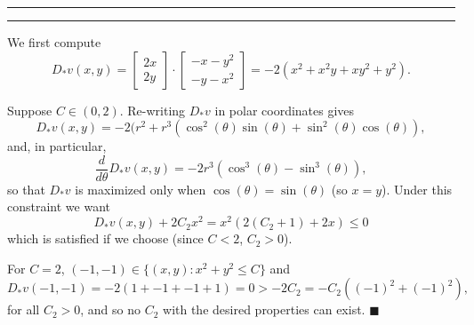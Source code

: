 \documentclass[11pt]{article}
\newcounter{questionCounter}
\newcounter{partCounter}[questionCounter]
\newenvironment{question}[2][\arabic{questionCounter}]{%
    \setcounter{partCounter}{0}%
    \vspace{.25in} \hrule \vspace{0.5em}%
        \noindent{\bf #2}%
    \vspace{0.8em} \hrule \vspace{.10in}%
    \addtocounter{questionCounter}{1}%
}{}
\renewcommand{\qed}{\quad $\blacksquare$}
\begin{document}
\begin{question}{Problem 3}
We first compute
\[D_*v(x,y)
    =   \begin{bmatrix}
            2x  \\
            2y
    \end{bmatrix}
  \cdot \begin{bmatrix}
            -x - y^2    \\
            -y - x^2
        \end{bmatrix}
    =   -2(x^2 + x^2y + xy^2 + y^2).
\]

Suppose $C \in (0,2)$. Re-writing $D_*v$ in polar coordinates gives
\[D_*v(x,y)
    =   -2(r^2 + r^3(\cos^2(\theta)\sin(\theta) + \sin^2(\theta)\cos(\theta)),
\]
and, in particular,
\[\frac{d}{d\theta} D_*v(x,y) = -2r^3(\cos^3(\theta) - \sin^3(\theta)),\]
so that $D_*v$ is maximized only when $\cos(\theta) = \sin(\theta)$ (so
$x = y$). Under this constraint we want
\[D_*v(x,y) + 2C_2x^2 = x^2(2(C_2 + 1) + 2x) \leq 0\]
which is satisfied if we choose  (since
$C < 2$, $C_2 > 0$).

For $C = 2$, $(-1,-1) \in \{(x,y) : x^2 + y^2 \leq C\}$ and
\[D_*v(-1,-1) = -2(1 + -1 + -1 + 1) = 0 > -2C_2 = -C_2 ((-1)^2 + (-1)^2),\]
for all $C_2 > 0$, and so no $C_2$ with the desired properties can exist. \qed
\end{question}
\end{document}
